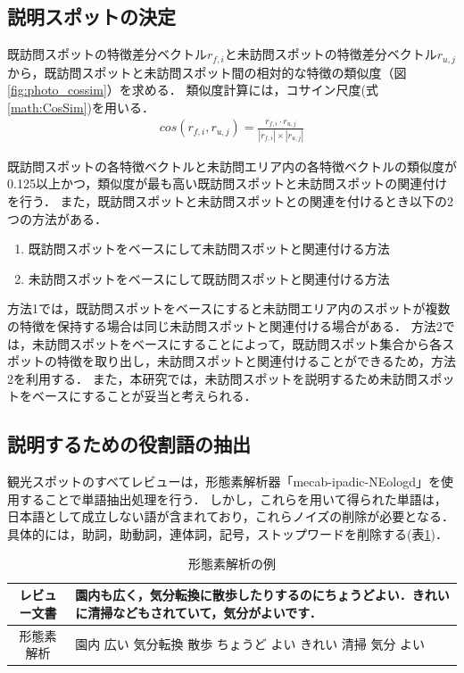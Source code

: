 \documentclass{deimj}
\begin{document}
\subsection{説明スポットの決定}
\label{subsec:説明スポットの決定}

既訪問スポットの特徴差分ベクトル$r_{f,i}$と未訪問スポットの特徴差分ベクトル$r_{u,j}$から，既訪問スポットと未訪問スポット間の相対的な特徴の類似度（図\ref{fig:photo_cossim}）を求める．
類似度計算には，コサイン尺度(式\ref{math:CosSim})を用いる．
\begin{eqnarray}
  cos(r_{f,i},r_{u,j})=\frac{r_{f,i} \cdot r_{u,j}}{|r_{f,i}| \times |r_{u,j}|}
  \label{math:CosSim}
\end{eqnarray}

既訪問スポットの各特徴ベクトルと未訪問エリア内の各特徴ベクトルの類似度が0.125以上かつ，類似度が最も高い既訪問スポットと未訪問スポットの関連付けを行う．
また，既訪問スポットと未訪問スポットとの関連を付けるとき以下の2つの方法がある．

\begin{enumerate}
  \item 既訪問スポットをベースにして未訪問スポットと関連付ける方法
  \item 未訪問スポットをベースにして既訪問スポットと関連付ける方法
\end{enumerate}

方法1では，既訪問スポットをベースにすると未訪問エリア内のスポットが複数の特徴を保持する場合は同じ未訪問スポットと関連付ける場合がある．
方法2では，未訪問スポットをベースにすることによって，既訪問スポット集合から各スポットの特徴を取り出し，未訪問スポットと関連付けることができるため，方法2を利用する．
また，本研究では，未訪問スポットを説明するため未訪問スポットをベースにすることが妥当と考えられる．

\subsection{説明するための役割語の抽出}
\label{subsec:説明するための役割語の抽出}
観光スポットのすべてレビューは，形態素解析器「mecab-ipadic-NEologd」を使用することで単語抽出処理を行う．
しかし，これらを用いて得られた単語は，日本語として成立しない語が含まれており，これらノイズの削除が必要となる．
具体的には，助詞，助動詞，連体詞，記号，ストップワードを削除する(表\ref{table:mecab})．

\begin{table}[t]
  \caption{形態素解析の例}
  \label{table:mecab}
  \centering
    \begin{tabular}{c|p{}} \hline
      レビュー文書 & 園内も広く，気分転換に散歩したりするのにちょうどよい．きれいに清掃などもされていて，気分がよいです．\\
      \hline
      形態素解析 & 園内 広い 気分転換 散歩 ちょうど よい きれい 清掃 気分 よい\\
      \hline
    \end{tabular}
\end{table}
\end{document}
